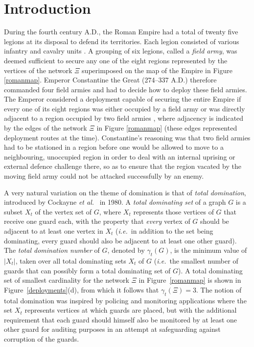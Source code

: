 \documentclass[10pt,a4paper]{article}
\begin{document}
\section{Introduction}
During the fourth century A.D., the Roman Empire had a total of twenty five legions at its disposal to defend its territories. Each legion consisted of various infantry and cavalry units \cite{luttwak}.  A grouping of six legions, called a {\em field army}, was deemed sufficient to secure any one of the eight regions represented by the vertices of the network $\Xi$ superimposed on the map of the Empire in Figure \ref{romanmap}. Emperor Constantine the Great (274--337 A.D.) therefore commanded four field armies and had to decide how to deploy these field armies.  The Emperor considered a deployment capable of securing the entire Empire if every one of its eight regions was either occupied by a field army or was directly adjacent to a region occupied by two field armies \cite{peterson}, where adjacency is indicated by the edges of the network $\Xi$ in Figure \ref{romanmap} (these edges represented deployment routes at the time).  Constantine's reasoning was that two field armies had to be stationed in a region 
before one would be allowed to move to a neighbouring, unoccupied region in order to deal with an internal uprising or external defence challenge there, so as to ensure that the region vacated by the moving field army could not be attacked successfully by an enemy.
 


A very natural variation on the theme of domination is that of {\em total domination}, introduced by Cockayne {\em et al.}\ \cite{cockayne3} in 1980.  A {\em total dominating set} of a graph $G$ is a subset $X_t$ of the vertex set of $G$, where $X_t$ represents those vertices of $G$ that receive one guard each, with the property that {\em every} vertex of $G$ should be adjacent to at least one vertex in $X_t$ ({\em i.e.}\ in addition to the set being dominating, every guard should also be adjacent to at least one other guard). The {\em total domination number} of $G$, denoted by $\gamma_t(G)$, is the minimum value of $|X_t|$, taken over all total dominating sets $X_t$ of $G$ ({\em i.e.}\ the smallest number of guards that can possibly form a total dominating set of $G$). A total dominating set of smallest cardinality for the network $\Xi$ in Figure~\ref{romanmap} is shown in Figure~\ref{deployments}(d), from which it follows that $\gamma_t(\Xi)=3$. The notion of total domination was inspired by policing and 
monitoring applications where the set $X_t$ represents vertices at which guards are placed, but with the additional requirement that each guard should himself also be monitored by at least one other guard for auditing purposes in an attempt at safeguarding against corruption of the guards. 
 
\end{document}
